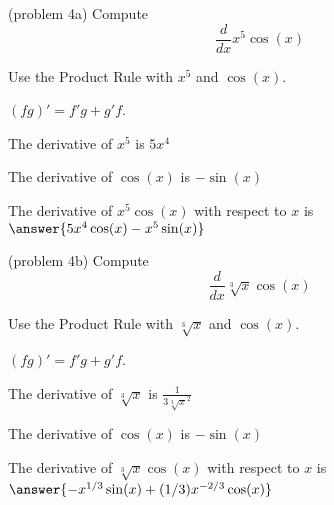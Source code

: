 \documentclass[handout]{ximera}
\begin{document}
\begin{center}
\begin{foldable}
\end{foldable}
\end{center}


\begin{problem}(problem 4a)
  Compute
  \[
  \frac{d}{dx} x^5\cos(x)
  \]
  
    \begin{hint}
      Use the Product Rule with $x^5$ and $\cos(x)$.
    \end{hint}
    \begin{hint}
      $(fg)' = f'g+g'f$.
    \end{hint}
    \begin{hint}
      The derivative of $x^5$ is $5x^4$
    \end{hint}
    \begin{hint}
      The derivative of $\cos(x)$ is $-\sin(x)$
    \end{hint}
    
		The derivative of $x^5\cos(x)$ with respect to $x$ is
		 $\answer{5x^4\cos(x) - x^5\sin(x)}$
		
\end{problem}



\begin{problem}(problem 4b)
  Compute
  \[
  \frac{d}{dx} \sqrt[3]x \cos(x)
  \]
  
    \begin{hint}
      Use the Product Rule with $\sqrt[3] x$ and $\cos(x)$.
    \end{hint}
    \begin{hint}
      $(fg)' = f'g+g'f$.
    \end{hint}
    \begin{hint}
      The derivative of $\sqrt[3]x$ is $\frac{1}{3\sqrt[3]x^2}$
    \end{hint}
    \begin{hint}
      The derivative of $\cos(x)$ is $-\sin(x)$
    \end{hint}
    
		The derivative of $\sqrt[3]x\cos(x)$ with respect to $x$ is
		 $\answer{-x^{1/3}\sin(x) + (1/3)x^{-2/3}\cos(x)}$
		
\end{problem}
\end{document}
